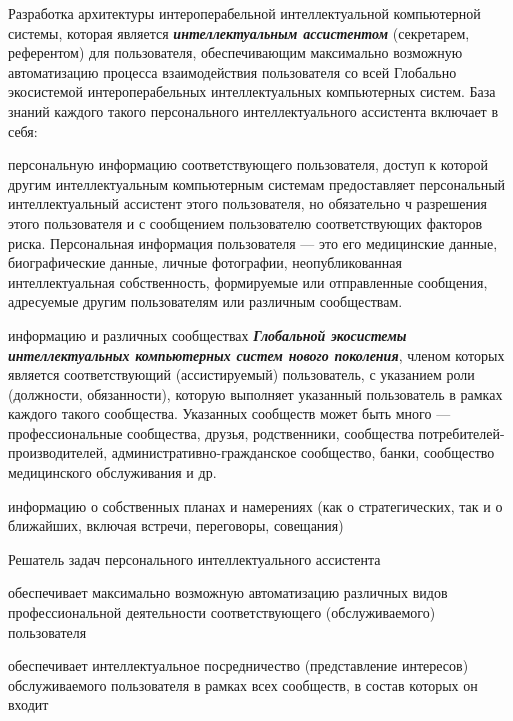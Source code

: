 \begin{textitemize}
	\item Разработка архитектуры интероперабельной интеллектуальной компьютерной системы, которая является \textbf{\textit{ интеллектуальным ассистентом}} (секретарем, референтом) для  пользователя, обеспечивающим максимально возможную автоматизацию процесса взаимодействия пользователя со всей Глобально экосистемой интероперабельных интеллектуальных компьютерных систем. База знаний каждого такого персонального интеллектуального ассистента включает в себя:
	\begin{textitemize}
		\item персональную информацию соответствующего пользователя, доступ к которой другим интеллектуальным компьютерным системам предоставляет персональный интеллектуальный ассистент этого пользователя, но обязательно ч разрешения этого пользователя и с сообщением пользователю соответствующих факторов риска. Персональная информация пользователя --- это его медицинские данные, биографические данные, личные фотографии, неопубликованная интеллектуальная собственность, формируемые или отправленные сообщения, адресуемые другим пользователям или различным сообществам.
		\item информацию и различных сообществах \textbf{\textit{Глобальной экосистемы интеллектуальных компьютерных систем нового поколения}}, членом которых является соответствующий (ассистируемый) пользователь, с указанием роли (должности, обязанности), которую выполняет указанный пользователь в рамках каждого такого сообщества. Указанных сообществ может быть много --- профессиональные сообщества, друзья, родственники, сообщества потребителей-производителей, административно-гражданское сообщество, банки, сообщество медицинского обслуживания и др.
		\item информацию о собственных планах и намерениях (как о стратегических, так и о ближайших, включая встречи, переговоры, совещания)
	\end{textitemize}
	Решатель задач персонального интеллектуального ассистента
	\begin{textitemize}
		\item обеспечивает максимально возможную автоматизацию различных видов профессиональной   деятельности соответствующего (обслуживаемого) пользователя 
		\item обеспечивает интеллектуальное посредничество (представление интересов) обслуживаемого пользователя в рамках всех сообществ, в состав которых он входит
	\end{textitemize}

\end{textitemize}
